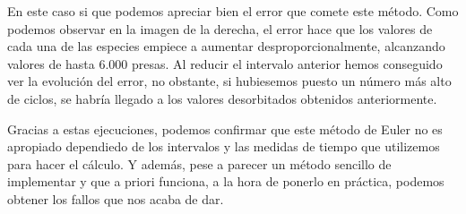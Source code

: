 \documentclass[11pt,a4paper]{article}
\begin{document}
En este caso si que podemos apreciar bien el error que comete este método. Como podemos observar en la imagen de la derecha, el error hace que los valores
de cada una de las especies empiece a aumentar desproporcionalmente, alcanzando valores de hasta 6.000 presas. Al reducir el intervalo anterior hemos
conseguido ver la evolución del error, no obstante, si hubiesemos puesto un número más alto de ciclos, se habría llegado a los valores desorbitados obtenidos
anteriormente.

Gracias a estas ejecuciones, podemos confirmar que este método de Euler no es apropiado dependiedo de los intervalos y las medidas de tiempo que utilizemos
para hacer el cálculo. Y además, pese a parecer un método sencillo de implementar y que a priori funciona, a la hora de ponerlo en práctica, podemos obtener
los fallos que nos acaba de dar.
\end{document}
